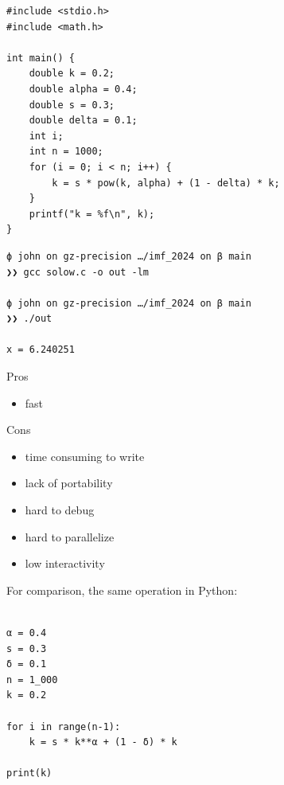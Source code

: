 \documentclass[
    xcolor={svgnames,dvipsnames},
    hyperref={colorlinks, citecolor=DeepPink4, linkcolor=DarkRed, urlcolor=DarkBlue}
    ]{beamer}  %
\newcommand{\1}{\mathbbm 1}
\begin{document}
\begin{frame}[fragile]
    
    \begin{verbatim}
#include <stdio.h>
#include <math.h>

int main() {
    double k = 0.2;
    double alpha = 0.4;
    double s = 0.3;
    double delta = 0.1;
    int i;
    int n = 1000;
    for (i = 0; i < n; i++) {
        k = s * pow(k, alpha) + (1 - delta) * k;
    }
    printf("k = %f\n", k);
}
    \end{verbatim}

\end{frame}



\begin{frame}[fragile]
    
    \begin{verbatim}
ϕ john on gz-precision …/imf_2024 on β main
❯❯ gcc solow.c -o out -lm

ϕ john on gz-precision …/imf_2024 on β main
❯❯ ./out 

x = 6.240251
    \end{verbatim}

\end{frame}

\begin{frame}

    Pros

    \begin{itemize}
        \item fast 
    \end{itemize}


    \vspace{0.5em}

    Cons

    \begin{itemize}
        \item time consuming to write
        \item lack of portability
        \item hard to debug
        \item hard to parallelize
        \item low interactivity
    \end{itemize}

\end{frame}

\begin{frame}[fragile]


    For comparison, the same operation in Python:
    
    \begin{verbatim}

α = 0.4
s = 0.3
δ = 0.1
n = 1_000
k = 0.2

for i in range(n-1):
    k = s * k**α + (1 - δ) * k

print(k)

    \end{verbatim}

\end{frame}
\end{document}
